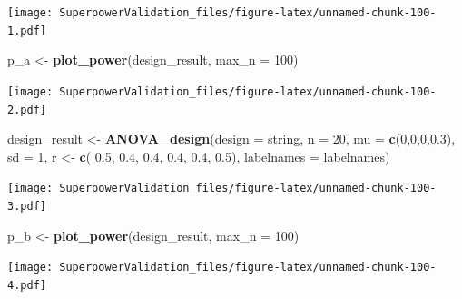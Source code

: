 \documentclass[]{book}
\newenvironment{Shaded}{\begin{snugshade}}{\end{snugshade}}
\newcommand{\DataTypeTok}[1]{\textcolor[rgb]{0.13,0.29,0.53}{#1}}
\newcommand{\DecValTok}[1]{\textcolor[rgb]{0.00,0.00,0.81}{#1}}
\newcommand{\FloatTok}[1]{\textcolor[rgb]{0.00,0.00,0.81}{#1}}
\newcommand{\KeywordTok}[1]{\textcolor[rgb]{0.13,0.29,0.53}{\textbf{#1}}}
\newcommand{\NormalTok}[1]{#1}
\newcommand{\StringTok}[1]{\textcolor[rgb]{0.31,0.60,0.02}{#1}}
\begin{document}
\texttt{[image: SuperpowerValidation\_files/figure-latex/unnamed-chunk-100-1.pdf]}

\begin{Shaded}
\begin{Highlighting}[]
\NormalTok{p_a <-}\StringTok{ }\KeywordTok{plot_power}\NormalTok{(design_result,}
                      \DataTypeTok{max_n =} \DecValTok{100}\NormalTok{)}
\end{Highlighting}
\end{Shaded}

\texttt{[image: SuperpowerValidation\_files/figure-latex/unnamed-chunk-100-2.pdf]}

\begin{Shaded}
\begin{Highlighting}[]
\NormalTok{design_result <-}\StringTok{ }\KeywordTok{ANOVA_design}\NormalTok{(}\DataTypeTok{design =}\NormalTok{ string,}
                              \DataTypeTok{n =} \DecValTok{20}\NormalTok{, }
                              \DataTypeTok{mu =} \KeywordTok{c}\NormalTok{(}\DecValTok{0}\NormalTok{,}\DecValTok{0}\NormalTok{,}\DecValTok{0}\NormalTok{,}\FloatTok{0.3}\NormalTok{), }
                              \DataTypeTok{sd =} \DecValTok{1}\NormalTok{, }
\NormalTok{                              r <-}\StringTok{ }\KeywordTok{c}\NormalTok{(}
                                \FloatTok{0.5}\NormalTok{, }\FloatTok{0.4}\NormalTok{, }\FloatTok{0.4}\NormalTok{,}
                                \FloatTok{0.4}\NormalTok{, }\FloatTok{0.4}\NormalTok{,}
                                \FloatTok{0.5}\NormalTok{),}
                              \DataTypeTok{labelnames =}\NormalTok{ labelnames)}
\end{Highlighting}
\end{Shaded}

\texttt{[image: SuperpowerValidation\_files/figure-latex/unnamed-chunk-100-3.pdf]}

\begin{Shaded}
\begin{Highlighting}[]
\NormalTok{p_b <-}\StringTok{ }\KeywordTok{plot_power}\NormalTok{(design_result,}
                      \DataTypeTok{max_n =} \DecValTok{100}\NormalTok{)}
\end{Highlighting}
\end{Shaded}

\texttt{[image: SuperpowerValidation\_files/figure-latex/unnamed-chunk-100-4.pdf]}
\end{document}
